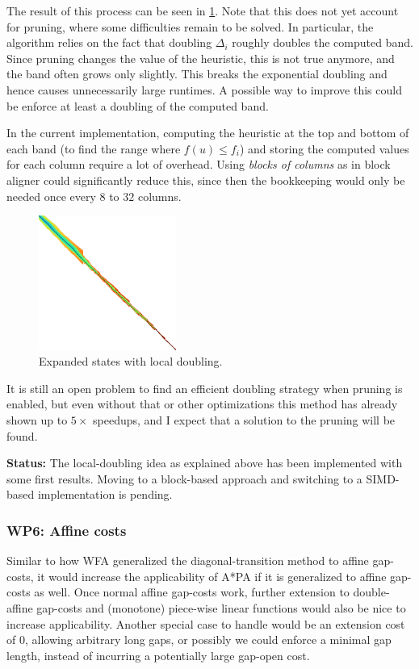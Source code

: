 \documentclass[11pt,english,a4paper]{article}
\begin{document}
The result of this process can be seen in \ref{local-doubling}. Note that this does
not yet account for pruning, where some difficulties remain to be solved. In
particular, the algorithm relies on the fact that doubling \(\Delta_i\) roughly
doubles the computed band. Since pruning changes the value of the heuristic,
this is not true anymore, and the band often grows only slightly. This breaks
the exponential doubling and hence causes unnecessarily large runtimes. A
possible way to improve this could be enforce at least a doubling of
the computed band.

In the current implementation, computing the heuristic at the top and bottom of
each band (to find the range where \(f(u) \leq f_i\)) and storing the computed
values for each column require a lot of overhead. Using \emph{blocks of
columns} as in block aligner \autocite{block-aligner} could significantly reduce
this, since then the bookkeeping would only be needed once every \(8\) to \(32\) columns.

\begin{figure}[htbp]
\centering
\includegraphics[width=0.4\textwidth]{local-doubling.png}
\caption{\label{local-doubling}Expanded states with local doubling.}
\end{figure}

It is still an open problem to find an efficient doubling strategy when pruning
is enabled, but even without that or other optimizations this method has already
shown up to \(5\times\) speedups, and I expect that a solution to the pruning will
be found.

\textbf{Status:} The local-doubling idea as explained above has been implemented with
some first results. Moving to a block-based approach and switching to a
SIMD-based implementation is pending.

\subsubsection{WP6: Affine costs}
\label{sec:orge9c3982}
Similar to how WFA \autocite{wfa} generalized the diagonal-transition method
\autocite{ukkonen85,myers86} to affine gap-costs, it would increase the
applicability of A*PA if it is generalized to affine gap-costs as well.
Once normal affine gap-costs work, further extension to double-affine gap-costs
and (monotone) piece-wise linear functions would also be nice to increase applicability.
Another special case to handle would be an extension cost of $0$, allowing
arbitrary long gaps, or possibly we could enforce a minimal gap length, instead
of incurring a potentially large gap-open cost.
\end{document}
